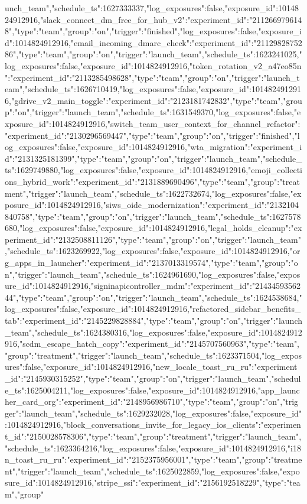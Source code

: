 {unch_team","schedule_ts":1627333337,"log_exposures":false,"exposure_id":1014824912916},"slack_connect_dm_free_for_hub_v2":{"experiment_id":"2112669796148","type":"team","group":"on","trigger":"finished","log_exposures":false,"exposure_id":1014824912916},"email_incoming_dmarc_check":{"experiment_id":"2112982875286","type":"team","group":"on","trigger":"launch_team","schedule_ts":1623241025,"log_exposures":false,"exposure_id":1014824912916},"token_rotation_v2_a47eo85n":{"experiment_id":"2113285498628","type":"team","group":"on","trigger":"launch_team","schedule_ts":1626710419,"log_exposures":false,"exposure_id":1014824912916},"gdrive_v2_main_toggle":{"experiment_id":"2123181742832","type":"team","group":"on","trigger":"launch_team","schedule_ts":1631549370,"log_exposures":false,"exposure_id":1014824912916},"switch_team_user_context_for_channel_refactor":{"experiment_id":"2130296569447","type":"team","group":"on","trigger":"finished","log_exposures":false,"exposure_id":1014824912916},"wta_migration":{"experiment_id":"2131325181399","type":"team","group":"on","trigger":"launch_team","schedule_ts":1629749880,"log_exposures":false,"exposure_id":1014824912916},"emoji_collections_hybrid_work":{"experiment_id":"2131889690496","type":"team","group":"treatment","trigger":"launch_team","schedule_ts":1622732674,"log_exposures":false,"exposure_id":1014824912916},"siws_oidc_modernization":{"experiment_id":"2132104840758","type":"team","group":"on","trigger":"launch_team","schedule_ts":1627578680,"log_exposures":false,"exposure_id":1014824912916},"legal_holds_cleanup":{"experiment_id":"2132508811126","type":"team","group":"on","trigger":"launch_team","schedule_ts":1623269922,"log_exposures":false,"exposure_id":1014824912916},"org_apps_in_launcher":{"experiment_id":"2137013319574","type":"team","group":"on","trigger":"launch_team","schedule_ts":1624961690,"log_exposures":false,"exposure_id":1014824912916},"signinapicontroller_mdm":{"experiment_id":"2143459356244","type":"team","group":"on","trigger":"launch_team","schedule_ts":1624538684,"log_exposures":false,"exposure_id":1014824912916},"refactored_sidebar_benefits_tab":{"experiment_id":"2145229828884","type":"team","group":"on","trigger":"launch_team","schedule_ts":1624380316,"log_exposures":false,"exposure_id":1014824912916},"scdm_escape_hatch_copy":{"experiment_id":"2145707560963","type":"team","group":"treatment","trigger":"launch_team","schedule_ts":1623371504,"log_exposures":false,"exposure_id":1014824912916},"new_locale_toast_ru_ru":{"experiment_id":"2145930315252","type":"team","group":"on","trigger":"launch_team","schedule_ts":1625004211,"log_exposures":false,"exposure_id":1014824912916},"app_launcher_card_org":{"experiment_id":"2148956986710","type":"team","group":"on","trigger":"launch_team","schedule_ts":1629232028,"log_exposures":false,"exposure_id":1014824912916},"block_conversations_invite_for_legacy_ios_clients":{"experiment_id":"2150028578306","type":"team","group":"treatment","trigger":"launch_team","schedule_ts":1623364216,"log_exposures":false,"exposure_id":1014824912916},"i18n_toast_ru_ru":{"experiment_id":"2152375956001","type":"team","group":"treatment","trigger":"launch_team","schedule_ts":1625022859,"log_exposures":false,"exposure_id":1014824912916},"stripe_ssi":{"experiment_id":"2156192518229","type":"team","group"}
